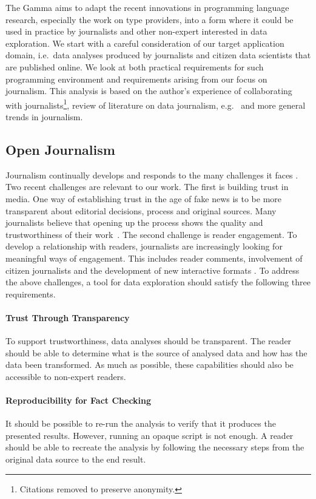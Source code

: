 \documentclass{sigchi}
\begin{document}
The Gamma aims to adapt the recent innovations in programming language research, especially the
work on type providers, into a form where it could be used in practice by journalists and other
non-expert interested in data exploration. We start with a careful consideration of our target
application domain, i.e.~data analyses produced by journalists and citizen data scientists that
are published online. We look at both practical requirements for such programming environment
and requirements arising from our focus on journalism. This analysis is based on the author's
experience of collaborating with journalists\footnote{Citations removed to preserve anonymity.},
review of literature on data journalism, e.g.~\cite{ddj,edcj17,edcj18} and more general trends in
journalism.

\subsection{Open Journalism}
Journalism continually develops and responds to the many challenges it faces \cite{future}.
Two recent challenges are relevant to our work. The first is building trust in media.
One way of establishing trust in the age of fake news is to be more transparent about editorial
decisions, process and original sources. Many journalists believe that opening up the process
shows the quality and trustworthiness of their work~\cite{transparency}.
The second challenge is reader engagement. To develop a relationship with readers, journalists are
increasingly looking for meaningful ways of engagement. This includes reader comments, involvement
of citizen journalists \cite{comments,citizen} and the development of new interactive formats
\cite{youdraw}. To address the above challenges, a tool for data exploration should satisfy the
following three requirements.

\paragraph{Trust Through Transparency}
To support trustworthiness, data analyses should be transparent. The reader should be able to
determine what is the source of analysed data and how has the data been transformed. As much as
possible, these capabilities should also be accessible to non-expert readers.

\paragraph{Reproducibility for Fact Checking}
It should be possible to re-run the analysis to verify that it produces the presented results.
However, running an opaque script is not enough. A reader should be able to recreate the analysis
by following the necessary steps from the original data source to the end result.
\end{document}
